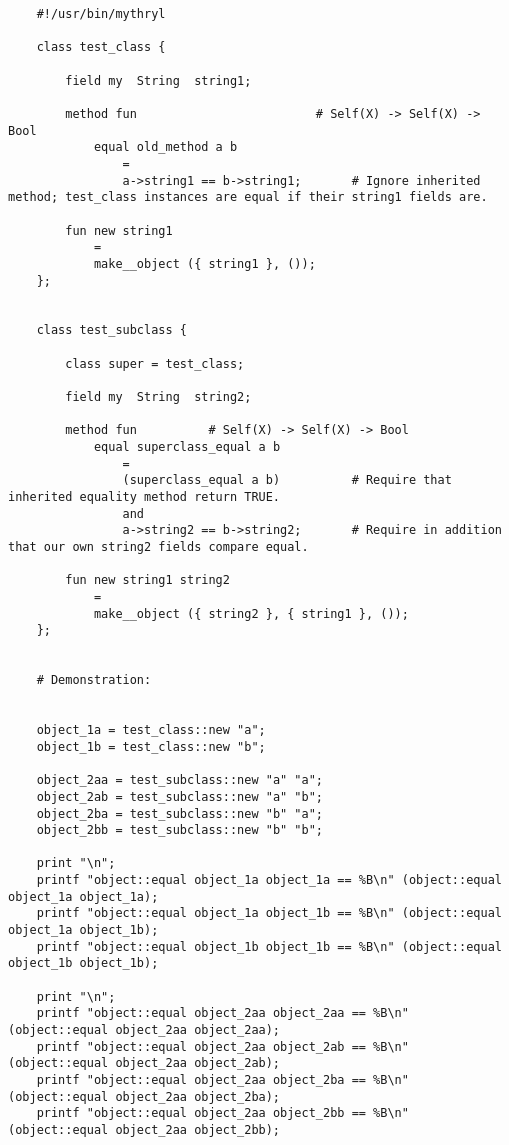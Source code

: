 \begin{verbatim}
    #!/usr/bin/mythryl

    class test_class {

        field my  String  string1;

        method fun                         # Self(X) -> Self(X) -> Bool
            equal old_method a b
                =
                a->string1 == b->string1;       # Ignore inherited method; test_class instances are equal if their string1 fields are.

        fun new string1
            =
            make__object ({ string1 }, ());
    };


    class test_subclass {

        class super = test_class;

        field my  String  string2;

        method fun          # Self(X) -> Self(X) -> Bool
            equal superclass_equal a b
                =
                (superclass_equal a b)          # Require that inherited equality method return TRUE.
                and
                a->string2 == b->string2;       # Require in addition that our own string2 fields compare equal.

        fun new string1 string2
            =
            make__object ({ string2 }, { string1 }, ());
    };


    # Demonstration:


    object_1a = test_class::new "a";
    object_1b = test_class::new "b";

    object_2aa = test_subclass::new "a" "a";
    object_2ab = test_subclass::new "a" "b";
    object_2ba = test_subclass::new "b" "a";
    object_2bb = test_subclass::new "b" "b";

    print "\n";
    printf "object::equal object_1a object_1a == %B\n" (object::equal object_1a object_1a);
    printf "object::equal object_1a object_1b == %B\n" (object::equal object_1a object_1b);
    printf "object::equal object_1b object_1b == %B\n" (object::equal object_1b object_1b);

    print "\n";
    printf "object::equal object_2aa object_2aa == %B\n" (object::equal object_2aa object_2aa);
    printf "object::equal object_2aa object_2ab == %B\n" (object::equal object_2aa object_2ab);
    printf "object::equal object_2aa object_2ba == %B\n" (object::equal object_2aa object_2ba);
    printf "object::equal object_2aa object_2bb == %B\n" (object::equal object_2aa object_2bb);


\end{verbatim}
